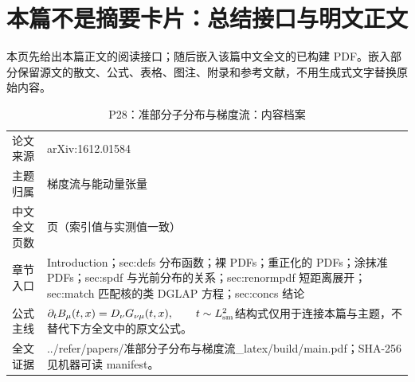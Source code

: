 \documentclass[UTF8,11pt,oneside]{ctexbook}
\begin{document}
\section*{本篇不是摘要卡片：总结接口与明文正文}
本页先给出本篇正文的阅读接口；随后嵌入该篇中文全文的已构建 PDF。嵌入部分保留源文的散文、公式、表格、图注、附录和参考文献，不用生成式文字替换原始内容。
\begin{table}[htbp]
  \centering
  \caption{P28：准部分子分布与梯度流：内容档案}
  \small
  \begin{tabularx}{0.96\textwidth}{@{}p{3.3cm}>{\raggedright\arraybackslash}X@{}}
    \toprule
    论文来源 & arXiv:1612.01584 \\
    主题归属 & 梯度流与能动量张量 \\
    中文全文页数 & 11 页（索引值与实测值一致） \\
    章节入口 & Introduction；sec:defs 分布函数；裸 PDFs；重正化的 PDFs；涂抹准 PDFs；sec:spdf 与光前分布的关系；sec:renormpdf 短距离展开；sec:match 匹配核的类 DGLAP 方程；sec:concs 结论 \\
    公式主线 & $\partial_t B_\mu(t,x)=D_\nu G_{\nu\mu}(t,x),\qquad t\sim L_{\rm sm}^{2}$\newline\scriptsize 结构式仅用于连接本篇与主题，不替代下方全文中的原文公式。 \\
    全文证据 & ../\allowbreak{}refer/\allowbreak{}papers/\allowbreak{}准部分子分布与梯度流\_\allowbreak{}latex/\allowbreak{}build/\allowbreak{}main.pdf；SHA-256 见机器可读 manifest。 \\
    \bottomrule
  \end{tabularx}
\end{table}
\end{document}
